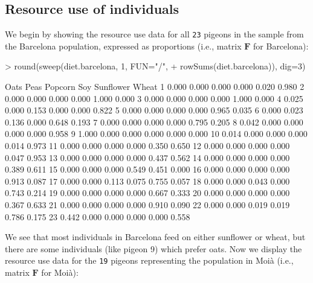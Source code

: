 \documentclass[11pt,a4paper]{article}
\begin{document}
\subsection{Resource use of individuals}
We begin by showing the resource use data for all \texttt{23} pigeons in the sample from the Barcelona population, expressed as proportions (i.e., matrix $\mathbf{F}$ for Barcelona):
\begin{Schunk}
\begin{Sinput}
> round(sweep(diet.barcelona, 1, FUN="/", 
+             rowSums(diet.barcelona)), dig=3)
\end{Sinput}
\begin{Soutput}
    Oats  Peas Popcorn   Soy Sunflower Wheat
1  0.000 0.000   0.000 0.000     0.020 0.980
2  0.000 0.000   0.000 0.000     1.000 0.000
3  0.000 0.000   0.000 0.000     1.000 0.000
4  0.025 0.000   0.153 0.000     0.000 0.822
5  0.000 0.000   0.000 0.000     0.965 0.035
6  0.000 0.023   0.136 0.000     0.648 0.193
7  0.000 0.000   0.000 0.000     0.795 0.205
8  0.042 0.000   0.000 0.000     0.000 0.958
9  1.000 0.000   0.000 0.000     0.000 0.000
10 0.014 0.000   0.000 0.000     0.014 0.973
11 0.000 0.000   0.000 0.000     0.350 0.650
12 0.000 0.000   0.000 0.000     0.047 0.953
13 0.000 0.000   0.000 0.000     0.437 0.562
14 0.000 0.000   0.000 0.000     0.389 0.611
15 0.000 0.000   0.000 0.549     0.451 0.000
16 0.000 0.000   0.000 0.000     0.913 0.087
17 0.000 0.000   0.113 0.075     0.755 0.057
18 0.000 0.000   0.043 0.000     0.743 0.214
19 0.000 0.000   0.000 0.000     0.667 0.333
20 0.000 0.000   0.000 0.000     0.367 0.633
21 0.000 0.000   0.000 0.000     0.910 0.090
22 0.000 0.000   0.019 0.019     0.786 0.175
23 0.442 0.000   0.000 0.000     0.000 0.558
\end{Soutput}
\end{Schunk}
We see that most individuals in Barcelona feed on either sunflower or wheat, but there are some individuals (like pigeon 9) which prefer oats. Now we display the resource use data for the \texttt{19} pigeons representing the population in Moià (i.e., matrix $\mathbf{F}$ for Moià):
\end{document}
